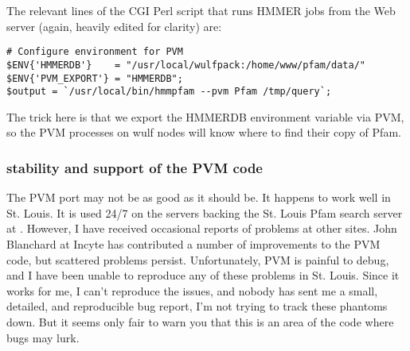 The relevant lines of the CGI Perl script that runs HMMER jobs from
the Web server (again, heavily edited for clarity) are:

\begin{verbatim}
# Configure environment for PVM
$ENV{'HMMERDB'}    = "/usr/local/wulfpack:/home/www/pfam/data/"
$ENV{'PVM_EXPORT'} = "HMMERDB";
$output = `/usr/local/bin/hmmpfam --pvm Pfam /tmp/query`;
\end{verbatim}

The trick here is that we export the HMMERDB environment variable via
PVM, so the PVM processes on wulf nodes will know where to find their
copy of Pfam.

\subsubsection{stability and support of the PVM code}

The PVM port may not be as good as it should be. It happens to work
well in St. Louis. It is used 24/7 on the servers backing the
St. Louis Pfam search server at
.  However,
I have received occasional reports of problems at other sites.  John
Blanchard at Incyte has contributed a number of improvements to the
PVM code, but scattered problems persist. Unfortunately, PVM is
painful to debug, and I have been unable to reproduce any of these
problems in St. Louis. Since it works for me, I can't reproduce the
issues, and nobody has sent me a small, detailed, and reproducible bug
report, I'm not trying to track these phantoms down. But it seems only
fair to warn you that this is an area of the code where bugs may lurk.








